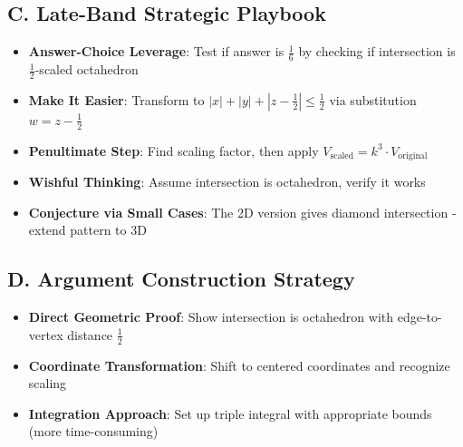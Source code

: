 \documentclass[11pt]{article}
\begin{document}
\begin{strategicbox}
\subsection*{C. Late-Band Strategic Playbook}
\begin{itemize}[leftmargin=*]
    \item \textbf{Answer-Choice Leverage}: Test if answer is $\frac{1}{6}$ by checking if intersection is $\frac{1}{2}$-scaled octahedron
    \item \textbf{Make It Easier}: Transform to $|x|+|y|+|z-\frac{1}{2}|\le\frac{1}{2}$ via substitution $w=z-\frac{1}{2}$
    \item \textbf{Penultimate Step}: Find scaling factor, then apply $V_{\text{scaled}} = k^3 \cdot V_{\text{original}}$
    \item \textbf{Wishful Thinking}: Assume intersection is octahedron, verify it works
    \item \textbf{Conjecture via Small Cases}: The 2D version gives diamond intersection - extend pattern to 3D
\end{itemize}

\subsection*{D. Argument Construction Strategy}
\begin{itemize}[leftmargin=*]
    \item \textbf{Direct Geometric Proof}: Show intersection is octahedron with edge-to-vertex distance $\frac{1}{2}$
    \item \textbf{Coordinate Transformation}: Shift to centered coordinates and recognize scaling
    \item \textbf{Integration Approach}: Set up triple integral with appropriate bounds (more time-consuming)
\end{itemize}
\end{strategicbox}
\end{document}
